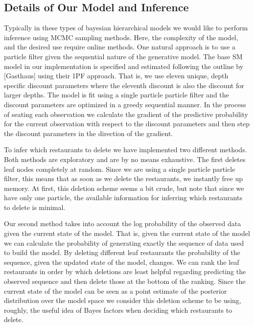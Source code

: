 \documentclass[12pt]{amsart}
\begin{document}
\subsection{Details of Our Model and Inference}

Typically in these types of bayesian hierarchical models we would like to perform inference using MCMC sampling methods.  Here, the complexity of the model, and the desired use require online methods.  One natural approach is to use a particle filter given the sequential nature of the generative model.  The base SM model in our implementation is specified and estimated following the outline by [Gasthaus] using their 1PF approach.  That is, we use eleven unique, depth specific discount parameters where the eleventh discount is also the discount for larger depths.  The model is fit using a single particle particle filter and the discount parameters are optimized in a greedy sequential manner.  In the process of seating each observation we calculate the gradient of the predictive probability for the current observation with respect to the discount parameters and then step the discount parameters in the direction of the gradient.

To infer which restaurants to delete we have implemented two different methods.  Both methods are exploratory and are by no means exhaustive.  The first deletes leaf nodes completely at random.  Since we are using a single particle particle filter, this means that as soon as we delete the restaurants, we instantly free up memory.  At first, this deletion scheme seems a bit crude, but note that since we have only one particle, the available information for inferring which restaurants to delete is minimal.  

Our second method takes into account the log probability of the observed data given the current state of the model.  That is, given the current state of the model we can calculate the probability of generating exactly the sequence of data used to build the model.  By deleting different leaf restaurants the probability of the sequence, given the updated state of the model, changes.  We can rank the leaf restaurants in order by which deletions are least helpful regarding predicting the observed sequence and then delete those at the bottom of the ranking.  Since the current state of the model can be seen as a point estimate of the posterior distribution over the model space we consider this deletion scheme to be using, roughly, the useful idea of Bayes factors when deciding which restaurants to delete.
\end{document}
